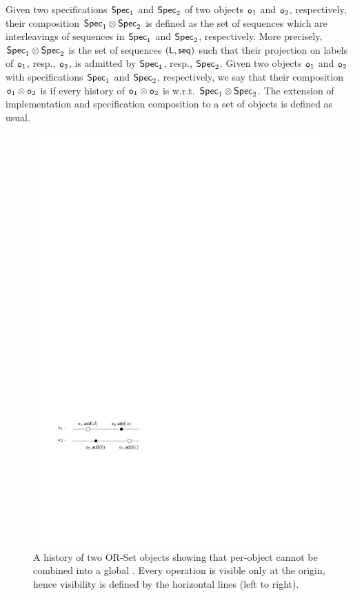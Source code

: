 Given two specifications $\mathsf{Spec}_1$ and $\mathsf{Spec}_2$ of two objects $\mathtt{o}_1$ and $\mathtt{o}_2$, respectively, their composition $\mathsf{Spec}_1\otimes \mathsf{Spec}_2$ is defined as the set of sequences which are interleavings of sequences in $\mathsf{Spec}_1$ and $\mathsf{Spec}_2$, respectively. More precisely, $\mathsf{Spec}_1\otimes \mathsf{Spec}_2$ is the set of sequences $(\mathsf{L},\mathsf{seq})$ such that their projection on labels of $\mathtt{o}_1$, resp., $\mathtt{o}_2$, is admitted by $\mathsf{Spec}_1$, resp., $\mathsf{Spec}_2$. Given two objects  $\mathtt{o}_1$ and $\mathtt{o}_2$ with specifications $\mathsf{Spec}_1$ and $\mathsf{Spec}_2$, respectively, we say that their composition $\mathtt{o}_1\otimes \mathtt{o}_2$ is \emph{\crdtlinearizable{}} if every history of $\mathtt{o}_1\otimes \mathtt{o}_2$ is \crdtlinearizable{} w.r.t. $\mathsf{Spec}_1\otimes \mathsf{Spec}_2$. The extension of implementation and specification composition to a set of objects is defined as usual.

\begin{figure}
  \vspace{-5pt}
  \centering
  \includegraphics[width=0.35 \textwidth]{figures/TwoSubLin-NotaGlobalLin.pdf}
\vspace{-5pt}
\caption{A history of two OR-Set objects showing that per-object  cannot be combined into a global \crdtlinearization{}. Every operation is visible only at the origin, hence visibility is defined by the horizontal lines (left to right).}
  \vspace{-9pt}
  \label{fig:negative_composition}
\end{figure}

